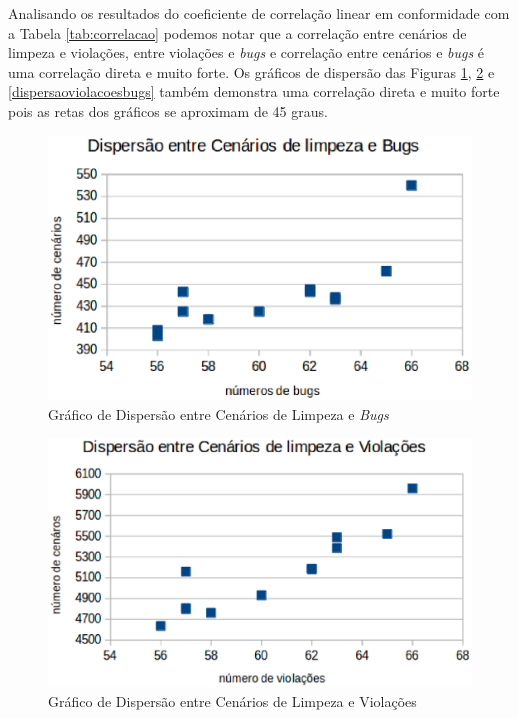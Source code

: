 Analisando os resultados do coeficiente de correlação linear em conformidade com a Tabela \ref{tab:correlacao} podemos notar que a correlação entre cenários de limpeza e violações, entre violações e \textit{bugs} e correlação entre cenários e \textit{bugs} é uma correlação direta e muito forte. Os gráficos de dispersão das Figuras \ref{dispercaocenariosbugs}, \ref{dispersaocenariosviolacoes} e \ref{dispersaoviolacoesbugs} também demonstra uma correlação direta e muito forte pois as retas dos gráficos se aproximam de 45 graus.

\begin{figure}[H]
\centering
\includegraphics[keepaspectratio=false,scale=0.7]{figuras/figuras_nilton/dispercaocenariosbugs.eps}
\caption{Gráfico de Dispersão entre Cenários de Limpeza e \textit{Bugs}}
\label{dispercaocenariosbugs}
\end{figure}


\begin{figure}[H]
\centering
\includegraphics[keepaspectratio=false,scale=0.7]{figuras/figuras_nilton/dispersaocenariosviolacoes.eps}
\caption{Gráfico de Dispersão entre Cenários de Limpeza e Violações}
\label{dispersaocenariosviolacoes}
\end{figure}

